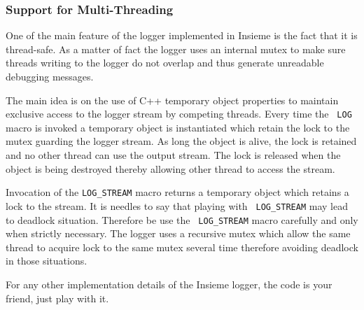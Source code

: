 \subsubsection{Support for Multi-Threading}

One of the main feature of the logger implemented in Insieme is the fact that it
is thread-safe. As a matter of fact the logger uses an internal mutex to make
sure threads writing to the logger do not overlap and thus generate unreadable
debugging messages. 

The main idea is on the use of C++ temporary object properties to maintain
exclusive access to the logger stream by competing threads. Every time the {\tt
LOG} macro is invoked a temporary object is instantiated which retain the lock
to the mutex guarding the logger stream. As long the object is alive, the lock
is retained and no other thread can use the output stream. The lock is released
when the object is being destroyed thereby allowing other thread to access the
stream. 

Invocation of the {\tt LOG\_STREAM} macro returns a temporary object which
retains a lock to the stream. It is needles to say that playing with {\tt
LOG\_STREAM} may lead to deadlock situation. Therefore be use the {\tt
LOG\_STREAM} macro carefully and only when strictly necessary. The logger uses a
recursive mutex which allow the same thread to acquire lock to the same mutex
several time therefore avoiding deadlock in those situations. 

For any other implementation details of the Insieme logger, the code is your
friend, just play with it.
 
